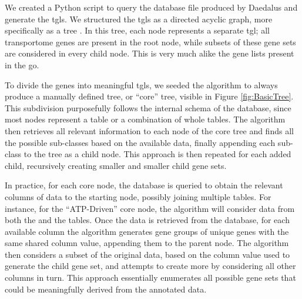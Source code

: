 We created a Python script to query the database file produced by Daedalus and
generate the \glspl{tgl}. We structured the \glspl{tgl} as a directed
acyclic graph, more specifically as a tree . In this tree, each node represents a
separate \gls{tgl}; all transportome genes are present in the root node, while
subsets of these gene sets are considered in every child node. This is very much
alike the gene lists present in the \gls{go}. %

To divide the genes into meaningful \glspl{tgl}, we seeded the algorithm to
always produce a manually defined tree, or ``core'' tree, visible in Figure
\ref{fig:BasicTree}. This subdivision purposefully follows the internal schema
of the database, since most nodes represent a table or a combination of whole
tables. The algorithm then retrieves all relevant information to each node of the
core tree and finds all the possible sub-classes based
on the available data, finally appending each sub-class to the tree as a child node.
This approach is then repeated for each added child, recursively
creating smaller and smaller child gene sets.

In practice, for each core node, the database is queried to obtain the
relevant columns of data to the starting node, possibly joining multiple tables. For instance, for the
``ATP-Driven'' core node, the algorithm will consider data from both the
 and the  tables. Once
the data is retrieved from the database, for each available column the algorithm
generates gene groups of unique genes with the same shared column value,
appending them to the parent node. The algorithm then considers a subset of the
original data, based on the column value used to generate the child gene set,
and attempts to create more by considering all other columns in turn. This
approach essentially enumerates all possible gene sets that could be
meaningfully derived from the annotated data. 

